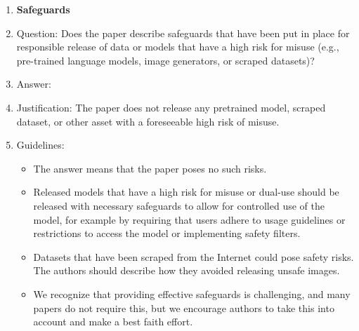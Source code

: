 \begin{enumerate}
\item {\bf Safeguards}
    \item[] Question: Does the paper describe safeguards that have been put in place for responsible release of data or models that have a high risk for misuse (e.g., pre-trained language models, image generators, or scraped datasets)?
    \item[] Answer: \answerNA{}
    \item[] Justification: The paper does not release any pretrained model, scraped dataset, or other asset with a foreseeable high risk of misuse.
    \item[] Guidelines:
    \begin{itemize}
        \item The answer \answerNA{} means that the paper poses no such risks.
        \item Released models that have a high risk for misuse or dual-use should be released with necessary safeguards to allow for controlled use of the model, for example by requiring that users adhere to usage guidelines or restrictions to access the model or implementing safety filters.
        \item Datasets that have been scraped from the Internet could pose safety risks. The authors should describe how they avoided releasing unsafe images.
        \item We recognize that providing effective safeguards is challenging, and many papers do not require this, but we encourage authors to take this into account and make a best faith effort.
    \end{itemize}


\end{enumerate}
